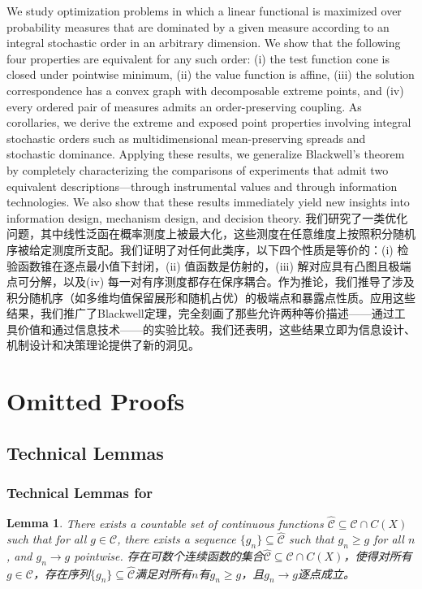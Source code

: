\documentclass[12pt,letterpaper]{article}
\newenvironment{original}{\color{black}}{}
\newenvironment{translation}{\color{blue}}{}
\theoremstyle{plain}
\newtheorem{lemma}{Lemma}
\theoremstyle{definition}
\theoremstyle{remark}
\newcommand{\C}{\mathcal{C}}
\theoremstyle{definition}
\begin{document}
\begin{original}
We study optimization problems in which a linear functional is maximized over probability measures that are dominated by a given measure according to an integral stochastic order in an arbitrary dimension. We show that the following four properties are equivalent for any such order: (i) the test function cone is closed under pointwise minimum, (ii) the value function is affine, (iii) the solution correspondence has a convex graph with decomposable extreme points, and (iv) every ordered pair of measures admits an order-preserving coupling. As corollaries, we derive the extreme and exposed point properties involving integral stochastic orders such as multidimensional mean-preserving spreads and stochastic dominance. Applying these results, we generalize Blackwell's theorem by completely characterizing the comparisons of experiments that admit two equivalent descriptions---through instrumental values and through information technologies. We also show that these results immediately yield new insights into information design, mechanism design, and decision theory.
\end{original}
\begin{translation}
我们研究了一类优化问题，其中线性泛函在概率测度上被最大化，这些测度在任意维度上按照积分随机序被给定测度所支配。我们证明了对任何此类序，以下四个性质是等价的：(i) 检验函数锥在逐点最小值下封闭，(ii) 值函数是仿射的，(iii) 解对应具有凸图且极端点可分解，以及(iv) 每一对有序测度都存在保序耦合。作为推论，我们推导了涉及积分随机序（如多维均值保留展形和随机占优）的极端点和暴露点性质。应用这些结果，我们推广了Blackwell定理，完全刻画了那些允许两种等价描述——通过工具价值和通过信息技术——的实验比较。我们还表明，这些结果立即为信息设计、机制设计和决策理论提供了新的洞见。
\end{translation}

\appendix
\section{Omitted Proofs}
\subsection{Technical Lemmas}
\subsubsection{Technical Lemmas for \texorpdfstring{}{Section 3}}
\begin{lemma}\label{lem:conti-approx}
\begin{original}
There exists a countable set of continuous functions $\widehat{\C} \subseteq \C \cap C(X)$ such that for all $g \in \C$, there exists a sequence $\{g_n\} \subseteq \widehat{\C}$ such that $g_n \geq g$ for all $n$, and $g_n \rightarrow g$ pointwise.
\end{original}
\begin{translation}
存在可数个连续函数的集合$\widehat{\C} \subseteq \C \cap C(X)$，使得对所有$g \in \C$，存在序列$\{g_n\} \subseteq \widehat{\C}$满足对所有$n$有$g_n \geq g$，且$g_n \rightarrow g$逐点成立。
\end{translation}
\end{lemma}
\end{document}

